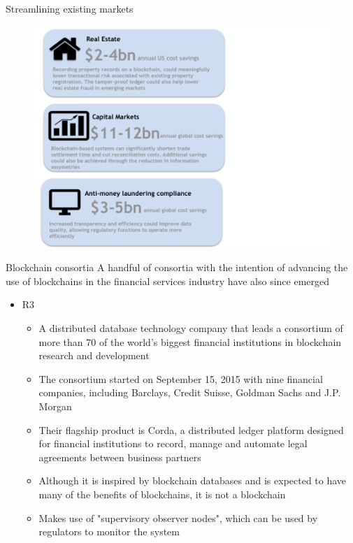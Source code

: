 \documentclass[10pt]{beamer}
\begin{document}

\begin{frame}{Streamlining existing markets}
	\begin{figure}[]
		\centering
		\includegraphics  [scale=0.3]{Images/savings}
	\end{figure}
\end{frame}


\begin{frame}{Blockchain consortia}
	A handful of consortia with the intention of advancing the use of blockchains in the financial services industry have also since emerged
	\begin{itemize}
		\item R3
		\begin{itemize}
			\item A distributed database technology company that leads a consortium of more than 70 of the world's biggest financial institutions in blockchain research and development
			\item The consortium started on September 15, 2015 with nine financial companies, including Barclays, Credit Suisse, Goldman Sachs and J.P. Morgan
			\item Their flagship product is Corda, a distributed ledger platform designed for financial institutions to record, manage and automate legal agreements between business partners
			\item Although it is inspired by blockchain databases and is expected to have many of the benefits of blockchains, it is not a blockchain
			\item Makes use of "supervisory observer nodes", which can be used by regulators to monitor the system
		\end{itemize}
	\end{itemize}
\end{frame}
\end{document}
